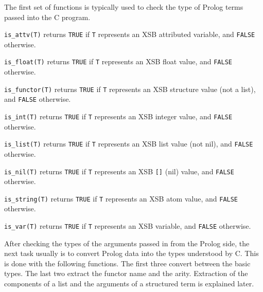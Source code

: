The first set of functions is typically used to check the type of
Prolog terms passed into the C program. %
\begin{description}
    {\tt is\_attv(T)} returns {\tt TRUE} if {\tt T} represents an XSB
    attributed variable,  and {\tt FALSE} otherwise.

    {\tt is\_float(T)} returns {\tt TRUE} if {\tt T} represents an XSB
    float value, and {\tt FALSE} otherwise.

    {\tt is\_functor(T)} returns {\tt TRUE} if {\tt T} represents an
    XSB structure value (not a list), and {\tt FALSE} otherwise.

    {\tt is\_int(T)} returns {\tt TRUE} if {\tt T} represents an XSB
    integer value, and {\tt FALSE} otherwise.

    {\tt is\_list(T)} returns {\tt TRUE} if {\tt T} represents an
    XSB list value (not nil), and {\tt FALSE} otherwise.

    {\tt is\_nil(T)} returns {\tt TRUE} if {\tt T} represents an XSB
    \verb|[]| (nil) value, and {\tt FALSE} otherwise.

    {\tt is\_string(T)} returns {\tt TRUE} if {\tt T} represents an XSB
    atom value, and {\tt FALSE} otherwise.

    {\tt is\_var(T)} returns {\tt TRUE} if {\tt T} represents an XSB
    variable, and {\tt FALSE} otherwise.

\end{description}

After checking the types of the arguments passed in from the Prolog side,
the next task usually is to convert Prolog data into the types understood
by C.  This is done with the following functions. The first three convert
between the basic types. The last two extract the functor name and the
arity.  Extraction of the components of a list and the arguments of a
structured term is explained later.

